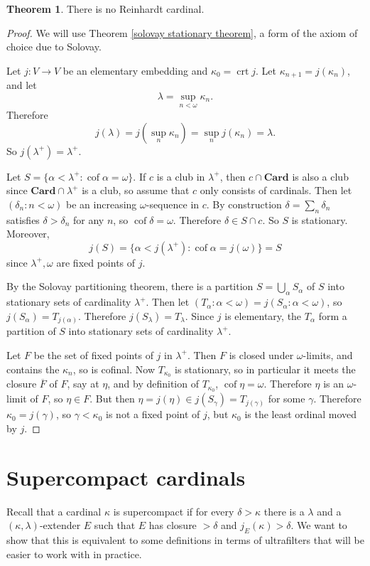 \documentclass[12pt]{report}
\newcommand{\Card}{\mathbf{Card}}
\DeclareMathOperator{\cof}{cof}
\DeclareMathOperator{\crt}{crt}
\theoremstyle{definition}
\newtheorem{theorem}{Theorem}[chapter]
\begin{document}
\begin{theorem}
There is no Reinhardt cardinal.
\end{theorem}
\begin{proof}
We will use Theorem \ref{solovay stationary theorem}, a form of the axiom of choice due to Solovay.

Let $j: V \to V$ be an elementary embedding and $\kappa_0 = \crt j$.
Let $\kappa_{n+1} = j(\kappa_n)$, and let
$$\lambda = \sup_{n < \omega} \kappa_n.$$
Therefore
$$j(\lambda) = j(\sup_n \kappa_n) = \sup_n j(\kappa_n) = \lambda.$$
So $j(\lambda^+) = \lambda^+$.

Let $S = \{\alpha < \lambda^+: \cof \alpha = \omega\}$.
If $c$ is a club in $\lambda^+$, then $c \cap \Card$ is also a club since $\Card \cap \lambda^+$ is a club, so assume that $c$ only consists of cardinals.
Then let $(\delta_n: n < \omega)$ be an increasing $\omega$-sequence in $c$. By construction $\delta = \sum_n \delta_n$ satisfies $\delta > \delta_n$ for any $n$,
so $\cof \delta = \omega$. Therefore $\delta \in S \cap c$. So $S$ is stationary.
Moreover,
$$j(S) = \{\alpha < j(\lambda^+): \cof \alpha = j(\omega)\} = S$$
since $\lambda^+,\omega$ are fixed points of $j$.

By the Solovay partitioning theorem, there is a partition $S = \bigcup_\alpha S_\alpha$ of $S$ into stationary sets of cardinality $\lambda^+$.
Then let $(T_\alpha: \alpha < \omega) = j(S_\alpha: \alpha < \omega)$, so $j(S_\alpha) = T_{j(\alpha)}$.
Therefore $j(S_\lambda) = T_\lambda$.
Since $j$ is elementary, the $T_\alpha$ form a partition of $S$ into stationary sets of cardinality $\lambda^+$.

Let $F$ be the set of fixed points of $j$ in $\lambda^+$. Then $F$ is closed under $\omega$-limits, and contains the $\kappa_n$, so is cofinal.
Now $T_{\kappa_0}$ is stationary, so in particular it meets the closure $\overline F$ of $F$, say at $\eta$, and by definition of $T_{\kappa_0}$, $\cof \eta = \omega$.
Therefore $\eta$ is an $\omega$-limit of $F$, so $\eta \in F$.
But then $\eta = j(\eta) \in j(S_\gamma) = T_{j(\gamma)}$ for some $\gamma$.
Therefore $\kappa_0 = j(\gamma)$, so $\gamma < \kappa_0$ is not a fixed point of $j$, but $\kappa_0$ is the least ordinal moved by $j$.
\end{proof}

\section{Supercompact cardinals}
Recall that a cardinal $\kappa$ is supercompact if for every $\delta > \kappa$ there is a $\lambda$ and a $(\kappa, \lambda)$-extender $E$ such that $E$ has closure $> \delta$ and $j_E(\kappa) > \delta$.
We want to show that this is equivalent to some definitions in terms of ultrafilters that will be easier to work with in practice.
\end{document}
